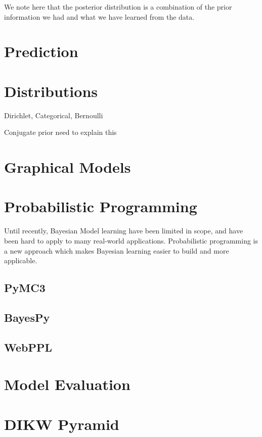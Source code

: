 \documentclass[11pt]{book}
\begin{document}
We note here that the posterior distribution is a combination of the prior information we had and what we have learned from the data. 




\section{Prediction}

\section{Distributions }

Dirichlet, Categorical, Bernoulli 

Conjugate prior  need to explain this 

\section{Graphical Models}

\section{Probabilistic Programming}

Until recently, Bayesian Model learning have been limited in scope, and have been hard to apply to many real-world applications. Probabilistic programming is a new approach which makes Bayesian learning easier to build and more applicable. 
\subsection{PyMC3}

\subsection{BayesPy}

\subsection{WebPPL}

\section{Model Evaluation}

\section{DIKW Pyramid }
\end{document}
